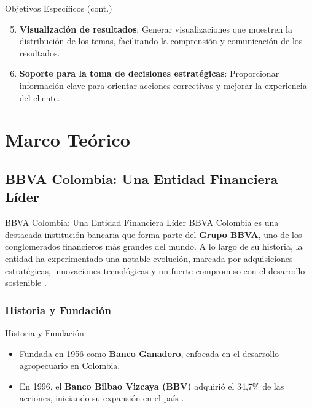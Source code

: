 \documentclass[aspectratio=169, xcolor={dvipsnames}, 10pt, spanish]{beamer}
\begin{document}
\begin{frame}{Objetivos Específicos (cont.)}
    \begin{enumerate}
        \setcounter{enumi}{4}
        \item \textbf{Visualización de resultados}: Generar visualizaciones que muestren la distribución de los temas, facilitando la comprensión y comunicación de los resultados.
        \item \textbf{Soporte para la toma de decisiones estratégicas}: Proporcionar información clave para orientar acciones correctivas y mejorar la experiencia del cliente.
    \end{enumerate}
\end{frame}

\section{Marco Teórico}
\subsection{BBVA Colombia: Una Entidad Financiera Líder}
\begin{frame}{BBVA Colombia: Una Entidad Financiera Líder}
    BBVA Colombia es una destacada institución bancaria que forma parte del \textbf{Grupo BBVA}, uno de los conglomerados financieros más grandes del mundo. A lo largo de su historia, la entidad ha experimentado una notable evolución, marcada por adquisiciones estratégicas, innovaciones tecnológicas y un fuerte compromiso con el desarrollo sostenible \cite{2}.
\end{frame}

\subsubsection{Historia y Fundación}
\begin{frame}{Historia y Fundación}
    \begin{itemize}
        \item Fundada en 1956 como \textbf{Banco Ganadero}, enfocada en el desarrollo agropecuario en Colombia.
        \item En 1996, el \textbf{Banco Bilbao Vizcaya (BBV)} adquirió el 34,7\% de las acciones, iniciando su expansión en el país \cite{2}.
    \end{itemize}
\end{frame}
\end{document}
